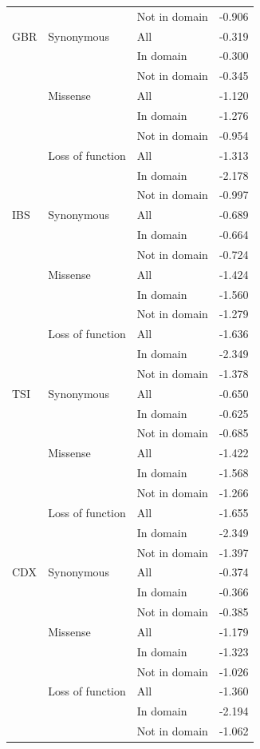 \documentclass[]{article}
\begin{document}
\begin{longtable}[t]{lllr}
 &  & Not in domain & -0.906\\
\addlinespace
GBR & Synonymous & All & -0.319\\
 &  & In domain & -0.300\\
 &  & Not in domain & -0.345\\
 & Missense & All & -1.120\\
 &  & In domain & -1.276\\
 &  & Not in domain & -0.954\\
 & Loss of function & All & -1.313\\
 &  & In domain & -2.178\\
 &  & Not in domain & -0.997\\
\addlinespace
IBS & Synonymous & All & -0.689\\
 &  & In domain & -0.664\\
 &  & Not in domain & -0.724\\
 & Missense & All & -1.424\\
 &  & In domain & -1.560\\
 &  & Not in domain & -1.279\\
 & Loss of function & All & -1.636\\
 &  & In domain & -2.349\\
 &  & Not in domain & -1.378\\
\addlinespace
TSI & Synonymous & All & -0.650\\
 &  & In domain & -0.625\\
 &  & Not in domain & -0.685\\
 & Missense & All & -1.422\\
 &  & In domain & -1.568\\
 &  & Not in domain & -1.266\\
 & Loss of function & All & -1.655\\
 &  & In domain & -2.349\\
 &  & Not in domain & -1.397\\
\addlinespace
CDX & Synonymous & All & -0.374\\
 &  & In domain & -0.366\\
 &  & Not in domain & -0.385\\
 & Missense & All & -1.179\\
 &  & In domain & -1.323\\
 &  & Not in domain & -1.026\\
 & Loss of function & All & -1.360\\
 &  & In domain & -2.194\\
 &  & Not in domain & -1.062\\

\end{longtable}
\end{document}
